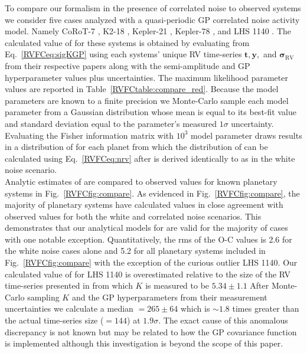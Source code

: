 

To compare our formalism in the presence of correlated noise to observed systems we consider five cases analyzed
with a quasi-periodic GP correlated noise activity model. Namely CoRoT-7 \citep{haywood14},
K2-18 \citep{cloutier17b}, Kepler-21 \citep{lopezmorales16}, Kepler-78 \citep{grunblatt15}, and
LHS 1140 \citep{dittmann17}. The calculated value of \nrv{} for these systems is obtained by evaluating
\sigK{} from Eq.~\ref{RVFCeq:sigKGP} using each systems' unique RV time-series $\mathbf{t},\mathbf{y},$ and
$\boldsymbol{\sigma}_{\text{RV}}$ from their
respective papers along with the semi-amplitude and GP hyperparameter values plus uncertainties.
The maximum likelihood parameter values are reported in Table~\ref{RVFCtable:compare_red}.
Because the model parameters are known to a finite precision we Monte-Carlo sample each model parameter
from a Gaussian distribution
whose mean is equal to its best-fit value and standard deviation equal to the parameter's measured $1\sigma$
uncertainty. Evaluating the Fisher information matrix with $10^3$ model parameter draws results in a
distribution of \sigK{} for each planet from which the distribution of \nrv{} can be calculated using
Eq.~\ref{RVFCeq:nrv} after \sigeff{} is derived identically to as in the white noise scenario. \\



Analytic estimates of \nrv{} are compared to observed values for known planetary
systems in Fig.~\ref{RVFCfig:compare}. As evidenced in Fig.~\ref{RVFCfig:compare}, the majority of planetary systems
have calculated \nrv{} values in close agreement with observed values for both the white and correlated noise
scenarios. 
This demonstrates that our analytical models for \nrv{} are valid for the majority of cases
with one notable exception. Quantitatively, the rms of the O-C \nrv{} values is 2.6 for the white noise
cases alone and 5.2 for all planetary systems included in Fig.~\ref{RVFCfig:compare} with the exception of
the curious outlier LHS 1140.
Our calculated value of \nrv{} for LHS 1140 is overestimated relative to the
size of the RV time-series presented in \cite{dittmann17} from which $K$ is measured to be $5.34 \pm 1.1$
 After Monte-Carlo sampling $K$ and the GP hyperparameters from their measurement
uncertainties we calculate a median \nrv{}$=265 \pm 64$ which is $\sim 1.8$ times greater than the actual
time-series size (\nrv{}$=144$) at $1.9\sigma$. The exact cause of this anomalous discrepancy is not known
but may be related to how the GP covariance function is implemented although this investigation is
beyond the scope of this paper.  

